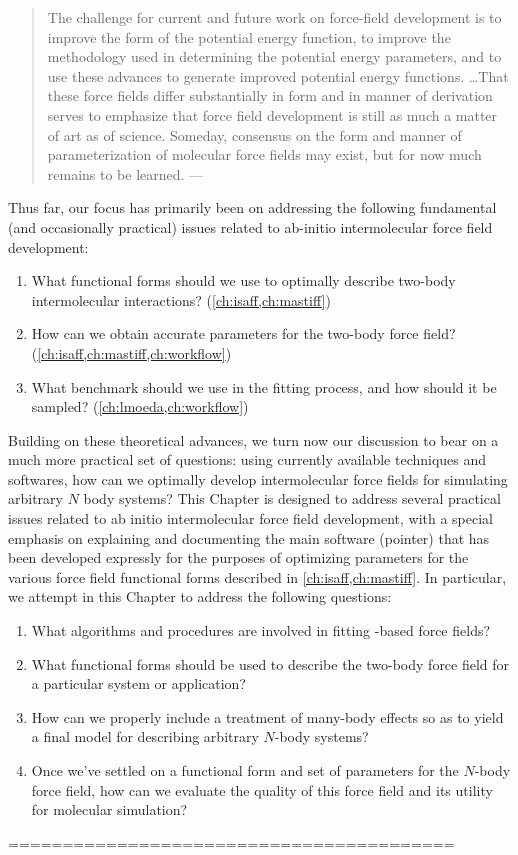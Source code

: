 \begin{quote}
The challenge for current and future work on force-field development is to
improve the form of the potential energy function, to improve the methodology
used in determining the potential energy parameters, and to use these
advances to generate improved potential energy functions.
\dots That these force fields differ substantially in form and in manner of
derivation serves to emphasize that force field development is still as much a
matter of art as of science. Someday, consensus on the form and manner of
parameterization of molecular force fields may exist, but for now much remains
to be learned.
--- \citeauthor{Halgren1995}
\end{quote}



Thus far, our focus has primarily been on addressing 
the following fundamental (and occasionally practical) issues related to ab-initio intermolecular force field development:
\begin{enumerate}
\item What functional forms should we use to optimally describe two-body
intermolecular interactions? 
(\cref{ch:isaff,ch:mastiff})
\item How can we obtain accurate parameters for the two-body force field?
(\cref{ch:isaff,ch:mastiff,ch:workflow})
\item What benchmark \pes should we use in the fitting process, and how should
it be sampled?
(\cref{ch:lmoeda,ch:workflow})
\end{enumerate}
Building on these theoretical advances, we turn now our discussion to bear on
a much
more practical set of questions: using currently available techniques and softwares,
how can we optimally develop intermolecular force fields for simulating
arbitrary $N$ body systems?
%
This Chapter is designed to address several practical issues related to 
ab initio intermolecular force field development, with a special emphasis on
explaining and documenting the main software (\acrshort{pointer}) that has been
developed expressly for the purposes of optimizing parameters for the various
force field functional forms described in
\cref{ch:isaff,ch:mastiff}. In particular, we attempt in this Chapter to
address the following questions:
\begin{enumerate}
\item What algorithms and procedures are involved in fitting \sapt-based force
fields?
\item What functional forms should be used to describe the two-body force
field for a particular system or application?
\item How can we properly include a treatment of many-body effects 
so as to yield a final model for describing arbitrary $N$-body
systems?
\item Once we've settled on a functional form and set of parameters for the
$N$-body force field, how can we evaluate the
quality of this force field and its utility for molecular simulation? 
\end{enumerate}



=========================================



